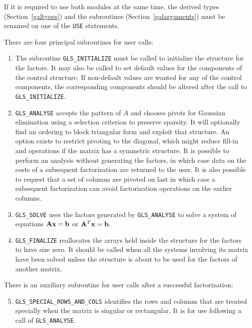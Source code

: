 \documentclass{galahad}
\newcommand{\packagename}{GLS}
\begin{document}
If it is required to use both modules at the same time, the derived types 
(Section~\ref{galtypes})
and the subroutines
(Section~\ref{galarguments})
must be renamed on one of the {\tt USE} statements.

There are four principal subroutines for user calls:

\begin{enumerate}

\item The subroutine {\tt \packagename\_INITIALIZE} must be 
called to initialize the
structure for the factors. It may also be called to set default values
for the components of the control structure. If non-default values are
wanted for any of the control components, the corresponding components
should be altered after the call to {\tt \packagename\_INITIALIZE}.
 
\item {\tt \packagename\_ANALYSE} accepts the pattern of $A$ and chooses
pivots for Gaussian elimination using a selection criterion to preserve
sparsity.  It will optionally find an ordering to block triangular form
and exploit that structure. An option exists to restrict pivoting to the
diagonal, which might reduce fill-in and operations if the matrix has a
symmetric structure. It is possible to perform an analysis without
generating the factors, in which case data on the costs of a subsequent
factorization are returned to the user.  It is also possible to request
that a set of columns are pivoted on last in which case a subsequent
factorization can avoid factorization operations on the earlier columns.

\item {\tt \packagename\_SOLVE} uses the factors generated by 
{\tt \packagename\_ANALYSE} to
solve a system of equations ${\mathbf{A}} {\mathbf{x}} = {\mathbf{b}}$ or ${\mathbf{A}}^T {\mathbf{x}} = {\mathbf{b}}$.

\item {\tt \packagename\_FINALIZE} reallocates the arrays held inside
the structure for the factors to have size zero. It should be called
when all the systems involving its matrix have been solved unless the
structure is about to be used for the factors of another matrix.

\end{enumerate}

\noindent There is an auxiliary subroutine for user calls after a 
successful factorization:

\begin{enumerate}
\setcounter{enumi}{4}

\item {\tt \packagename\_SPECIAL\_ROWS\_AND\_COLS} identifies the rows
and columns that are treated specially when the matrix is singular or
rectangular.  It is for use following a call of {\tt \packagename\_ANALYSE}.

\end{enumerate}
\end{document}
